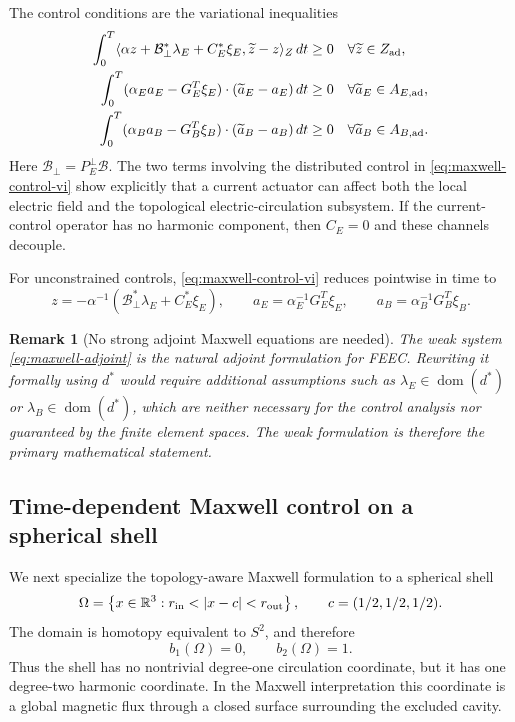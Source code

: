 \documentclass{article}
\newtheorem{remark}{Remark}[section]
\newcommand{\ip}[2]{\langle #1,#2\rangle}
\begin{document}
The control conditions are the variational inequalities
\begin{subequations}
\label{eq:maxwell-control-vi}
\begin{align}
  \int_0^T
  \ip{\alpha z+\mathcal B_\perp^*\lambda_E+C_E^*\xi_E}
      {\widetilde z-z}_Z\,dt
  &\ge0
  &&\forall\widetilde z\in Z_{\rm ad},
  \\
  \int_0^T
  (\alpha_Ea_E-G_E^T\xi_E)\cdot(\widetilde a_E-a_E)\,dt
  &\ge0
  &&\forall\widetilde a_E\in A_{E,{\rm ad}},
  \\
  \int_0^T
  (\alpha_Ba_B-G_B^T\xi_B)\cdot(\widetilde a_B-a_B)\,dt
  &\ge0
  &&\forall\widetilde a_B\in A_{B,{\rm ad}}.
\end{align}
\end{subequations}
Here $\mathcal B_\perp=P_E^\perp\mathcal B$.  The two terms involving the distributed control in \eqref{eq:maxwell-control-vi} show explicitly that a current actuator can affect both the local electric field and the topological electric-circulation subsystem.  If the current-control operator has no harmonic component, then $C_E=0$ and these channels decouple.

For unconstrained controls, \eqref{eq:maxwell-control-vi} reduces pointwise in time to
\begin{equation}
  z=-\alpha^{-1}(\mathcal B_\perp^*\lambda_E+C_E^*\xi_E),
  \qquad
  a_E=\alpha_E^{-1}G_E^T\xi_E,
  \qquad
  a_B=\alpha_B^{-1}G_B^T\xi_B.
\end{equation}

\begin{remark}[No strong adjoint Maxwell equations are needed]
The weak system \eqref{eq:maxwell-adjoint} is the natural adjoint formulation for FEEC.  Rewriting it formally using $d^*$ would require additional assumptions such as $\lambda_E\in\operatorname{dom}(d^*)$ or $\lambda_B\in\operatorname{dom}(d^*)$, which are neither necessary for the control analysis nor guaranteed by the finite element spaces.  The weak formulation is therefore the primary mathematical statement.
\end{remark}

\subsection{Time-dependent Maxwell control on a spherical shell}
\label{sec:maxwell-spherical-shell}

We next specialize the topology-aware Maxwell formulation to a
spherical shell
\begin{equation}
  \Omega
  =
  \left\{
    x\in\mathbb R^3:
    r_{\rm in}<|x-c|<r_{\rm out}
  \right\},
  \qquad c=(1/2,1/2,1/2).
\end{equation}
The domain is homotopy equivalent to $S^2$, and therefore
\[
  b_1(\Omega)=0,
  \qquad
  b_2(\Omega)=1.
\]
Thus the shell has no nontrivial degree-one circulation coordinate,
but it has one degree-two harmonic coordinate.  In the Maxwell
interpretation this coordinate is a global magnetic flux through a
closed surface surrounding the excluded cavity.
\end{document}
